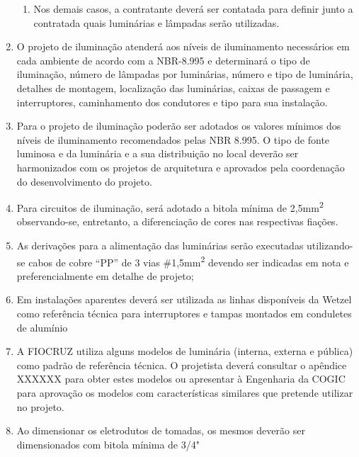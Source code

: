 \begin{enumerate}
\begin{enumerate}
		\item Nos demais casos, a contratante deverá ser contatada para definir junto a contratada quais luminárias e lâmpadas serão utilizadas.
		
	\end{enumerate}
	
	\item O projeto de iluminação atenderá aos níveis de iluminamento necessários em cada ambiente de acordo com a NBR-8.995 e determinará o tipo de iluminação, número de lâmpadas por luminárias, número e tipo de luminária, detalhes de montagem, localização das luminárias, caixas de passagem e interruptores, caminhamento dos condutores e tipo para sua instalação. 
	
	\item Para o projeto de iluminação poderão ser adotados os valores mínimos dos níveis de iluminamento recomendados pelas NBR 8.995. O tipo de fonte luminosa e da luminária e a sua distribuição no local deverão ser harmonizados com os projetos de arquitetura e aprovados pela coordenação do desenvolvimento do projeto.
	
	\item \label{lighting: bitola minima} Para circuitos de iluminação, será adotado a bitola mínima de 2,5mm\textsuperscript{2} observando-se, entretanto, a diferenciação de cores nas respectivas fiações.
	
	\item As derivações para a alimentação das luminárias serão executadas utilizando-se cabos de cobre “PP” de 3 vias \#1,5mm\textsuperscript{2} devendo ser indicadas em nota e preferencialmente em detalhe de projeto;
	
	\item Em instalações aparentes deverá ser utilizada as linhas disponíveis da Wetzel como referência técnica para interruptores e tampas montados em conduletes de alumínio
	
	\item A FIOCRUZ utiliza alguns modelos de luminária (interna, externa e pública) como padrão de referência técnica. O projetista deverá consultar o apêndice XXXXXX para obter estes modelos ou apresentar à Engenharia da COGIC para aprovação os modelos com características similares que pretende utilizar no projeto.
	
	\item Ao dimensionar os eletrodutos de tomadas, os mesmos deverão ser dimensionados com bitola mínima de 3/4"%
\end{enumerate}